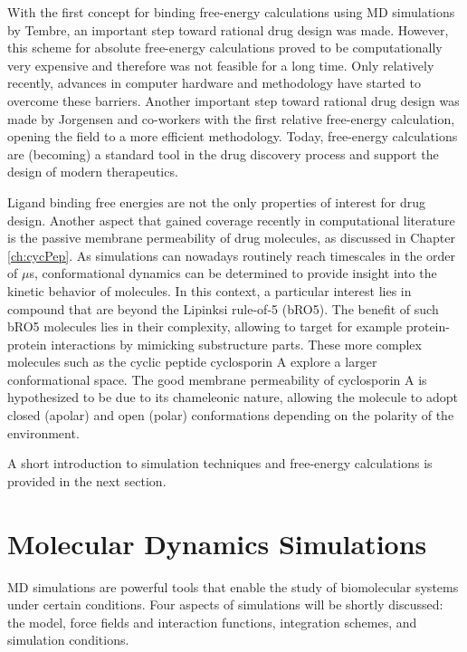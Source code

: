 With the first concept for binding free-energy calculations using MD simulations by Tembre\cite{Tembre1984}, an important step toward rational drug design was made. \cite{Durrant2011}
However, this scheme for absolute free-energy calculations proved to be computationally very expensive and therefore was not feasible for a long time. Only relatively recently, advances in computer hardware and methodology have started to overcome these barriers. \cite{Chodera2011, Aldeghi2016}
Another important step toward rational drug design was made by Jorgensen and co-workers with the first relative free-energy calculation, opening the field to a more efficient methodology.\cite{Jorgensen1983, Jorgensen1988, Chodera2011} 
Today, free-energy calculations are (becoming) a standard tool in the drug discovery process and support the design of modern therapeutics. \cite{Chodera2011, Christ2014,  Cournia2017, Cournia2020, Meier2021}
 
Ligand binding free energies are not the only properties of interest for drug design. Another aspect that gained coverage recently in computational literature is the passive membrane permeability of drug molecules, as discussed in Chapter \ref{ch:cycPep}. \cite{Witek2016, Witek2017, Witek2019,  Wang2021, Marrink1996, Bemporad2004, Lomize2019, Hoang2021, Sugita2021, Corbett2021} 
As simulations can nowadays routinely reach timescales in the order of $\mu$s, conformational dynamics can be determined to provide insight into the kinetic behavior of molecules.\cite{Witek2016, Witek2017} In this context, a particular interest lies in compound that are beyond the Lipinksi\cite{Lipinski2001} rule-of-5 (bRO5).\cite{Witek2016, Witek2017, Witek2019,  Wang2021, Sugita2021} The benefit of such bRO5 molecules lies in their complexity, allowing to target for example protein-protein interactions by mimicking substructure parts. \cite{Doak2016, Naylor2017, Poongavanam2018, Furukawa2020, Danelius2020} These more complex molecules such as the cyclic peptide cyclosporin A explore a larger conformational space. The good membrane permeability of cyclosporin A is hypothesized to be due to its chameleonic nature, allowing the molecule to adopt closed (apolar) and open (polar) conformations depending on the polarity of the environment.\cite{Witek2016, Witek2017}

A short introduction to simulation techniques and free-energy calculations is provided in the next section.

\section{Molecular Dynamics Simulations}
MD simulations are powerful tools that enable the study of biomolecular systems under certain conditions. Four aspects of simulations will be shortly discussed: the model, force fields and interaction functions, integration schemes, and simulation conditions.

